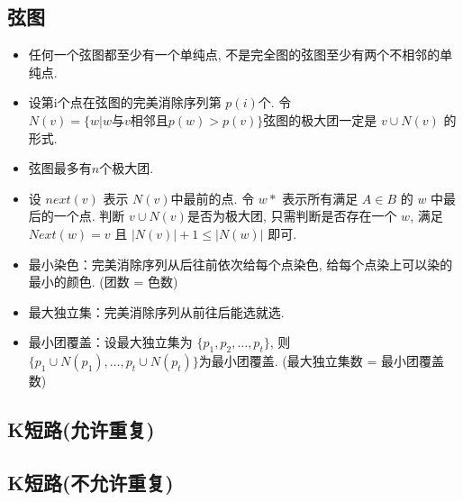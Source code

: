 \documentclass[landscape, twocolumn, 8pt, a4paper, twoside]{extarticle}
\begin{document}
\subsection{弦图}
\begin{itemize}
\item 任何一个弦图都至少有一个单纯点, 不是完全图的弦图至少有两个不相邻的单纯点. 
\item 设第i个点在弦图的完美消除序列第 $p(i)$个. 令 $N(v) = \{w | w \text{与} v \text{相邻且} p(w) > p(v) \}$弦图的极大团一定是 $v \cup N(v)$ 的形式. 
\item 弦图最多有$n$个极大团. 
\item 设 $next(v)$ 表示 $N(v)$中最前的点. 令 $w*$ 表示所有满足 $A\in B$ 的 $w$ 中最后的一个点. 
  判断 $v \cup N(v)$是否为极大团,
  只需判断是否存在一个 $w$, 
  满足 $Next(w) = v$ 且 $|N(v)| + 1 \le |N(w)|$ 即可. 
\item 最小染色：完美消除序列从后往前依次给每个点染色, 给每个点染上可以染的最小的颜色. (团数 = 色数)
\item 最大独立集：完美消除序列从前往后能选就选. 
\item 最小团覆盖：设最大独立集为 $\{p_1, p_2, \ldots, p_t\}$, 则 $\{p_1 \cup N(p_1), \ldots, p_t \cup N(p_t) \}$为最小团覆盖.  (最大独立集数 = 最小团覆盖数)
\end{itemize}



\subsection{K短路(允许重复)}


\subsection{K短路(不允许重复)}

\end{document}
